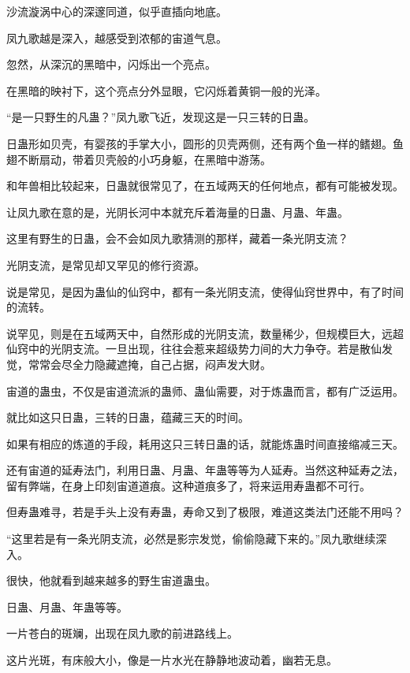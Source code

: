 
\begin{this_body}

沙流漩涡中心的深邃同道，似乎直插向地底。

凤九歌越是深入，越感受到浓郁的宙道气息。

忽然，从深沉的黑暗中，闪烁出一个亮点。

在黑暗的映衬下，这个亮点分外显眼，它闪烁着黄铜一般的光泽。

“是一只野生的凡蛊？”凤九歌飞近，发现这是一只三转的日蛊。

日蛊形如贝壳，有婴孩的手掌大小，圆形的贝壳两侧，还有两个鱼一样的鳍翅。鱼翅不断扇动，带着贝壳般的小巧身躯，在黑暗中游荡。

和年兽相比较起来，日蛊就很常见了，在五域两天的任何地点，都有可能被发现。

让凤九歌在意的是，光阴长河中本就充斥着海量的日蛊、月蛊、年蛊。

这里有野生的日蛊，会不会如凤九歌猜测的那样，藏着一条光阴支流？

光阴支流，是常见却又罕见的修行资源。

说是常见，是因为蛊仙的仙窍中，都有一条光阴支流，使得仙窍世界中，有了时间的流转。

说罕见，则是在五域两天中，自然形成的光阴支流，数量稀少，但规模巨大，远超仙窍中的光阴支流。一旦出现，往往会惹来超级势力间的大力争夺。若是散仙发觉，常常会尽全力隐藏遮掩，自己占据，闷声发大财。

宙道的蛊虫，不仅是宙道流派的蛊师、蛊仙需要，对于炼蛊而言，都有广泛运用。

就比如这只日蛊，三转的日蛊，蕴藏三天的时间。

如果有相应的炼道的手段，耗用这只三转日蛊的话，就能炼蛊时间直接缩减三天。

还有宙道的延寿法门，利用日蛊、月蛊、年蛊等等为人延寿。当然这种延寿之法，留有弊端，在身上印刻宙道道痕。这种道痕多了，将来运用寿蛊都不可行。

但寿蛊难寻，若是手头上没有寿蛊，寿命又到了极限，难道这类法门还能不用吗？

“这里若是有一条光阴支流，必然是影宗发觉，偷偷隐藏下来的。”凤九歌继续深入。

很快，他就看到越来越多的野生宙道蛊虫。

日蛊、月蛊、年蛊等等。

一片苍白的斑斓，出现在凤九歌的前进路线上。

这片光斑，有床般大小，像是一片水光在静静地波动着，幽若无息。


\end{this_body}
